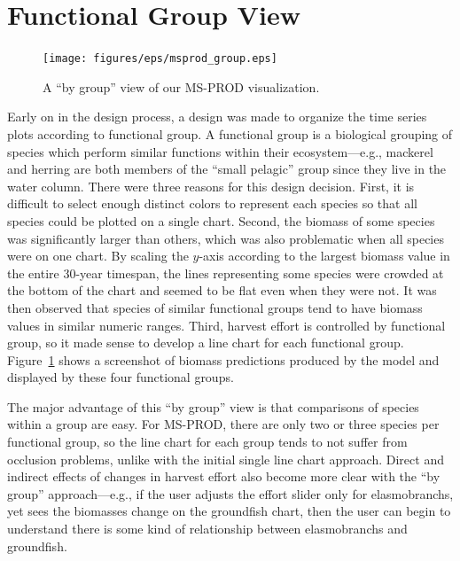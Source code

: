 \section{Functional Group View}

\begin{figure}[h]
	\centering
	\texttt{[image: figures/eps/msprod\_group.eps]}
	\caption{A ``by group'' view of our MS-PROD visualization.}
	\label{fig:msprod_group}
\end{figure}

Early on in the design process, a design was made to organize the time series plots according to functional group.  A functional group is a biological grouping of species which perform similar functions within their ecosystem---e.g., mackerel and herring are both members of the ``small pelagic'' group since they live in the water column.  There were three reasons for this design decision.  First, it is difficult to select enough distinct colors to represent each species so that all species could be plotted on a single chart.  Second, the biomass of some species was significantly larger than others, which was also problematic when all species were on one chart.  By scaling the $y$-axis according to the largest biomass value in the entire 30-year timespan, the lines representing some species were crowded at the bottom of the chart and seemed to be flat even when they were not.  It was then observed that species of similar functional groups tend to have biomass values in similar numeric ranges.  Third, harvest effort is controlled by functional group, so it made sense to develop a line chart for each functional group.  Figure~\ref{fig:msprod_group} shows a screenshot of biomass predictions produced by the model and displayed by these four functional groups.


The major advantage of this ``by group'' view is that comparisons of species within a group are easy.  For MS-PROD, there are only two or three species per functional group, so the line chart for each group tends to not suffer from occlusion problems, unlike with the initial single line chart approach.  Direct and indirect effects of changes in harvest effort also become more clear with the ``by group'' approach---e.g., if the user adjusts the effort slider only for elasmobranchs, yet sees the biomasses change on the groundfish chart, then the user can begin to understand there is some kind of relationship between elasmobranchs and groundfish.

